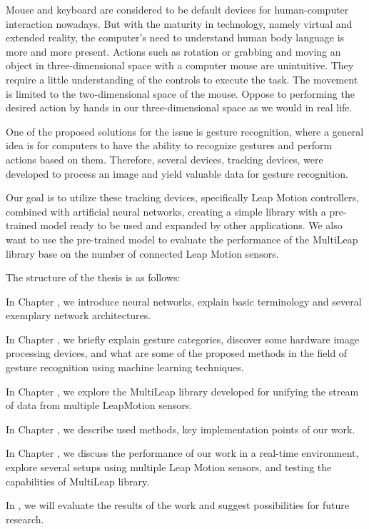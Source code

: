 Mouse and keyboard are considered to be default devices for human-computer interaction nowadays. But with the maturity in technology, namely virtual and extended reality, the computer's need to understand human body language is more and more present. Actions such as rotation or grabbing and moving an object in three-dimensional space with a computer mouse are unintuitive. They require a little understanding of the controls to execute the task. The movement is limited to the two-dimensional space of the mouse. Oppose to performing the desired action by hands in our three-dimensional space as we would in real life.

One of the proposed solutions for the issue is gesture recognition, where a general idea is for computers to have the ability to recognize gestures and perform actions based on them. Therefore, several devices, tracking devices, were developed to process an image and yield valuable data for gesture recognition.

Our goal is to utilize these tracking devices, specifically Leap Motion controllers, combined with artificial neural networks, creating a simple library with a pre-trained model ready to be used and expanded by other applications. We also want to use the pre-trained model to evaluate the performance of the MultiLeap library base on the number of connected Leap Motion sensors.

The structure of the thesis is as follows:
\begin{description}

    \item In Chapter , we introduce neural networks, explain basic terminology and several exemplary network architectures.
    
    \item In Chapter , we briefly explain gesture categories, discover some hardware image processing devices, and what are some of the proposed methods in the field of gesture recognition using machine learning techniques.
    
    \item In Chapter , we explore the MultiLeap library developed for unifying the stream of data from multiple LeapMotion sensors.
    
    \item In Chapter , we describe used methods, key implementation points of our work.
    
    \item In Chapter , we discuss the performance of our work in a real-time environment, explore several setups using multiple Leap Motion sensors, and testing the capabilities of MultiLeap library.

    \item In , we will evaluate the results of the work and suggest possibilities for future research.
\end{description}